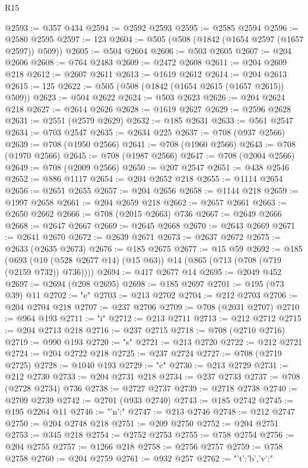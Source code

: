 \begin{lexlean}{R15}
\begin{coremodule}
{{{{{@2593 := @357 @434
@2594 := @2592 @2593
@2595 := @2585 @2594
@2596 := @2580 @2595
@2597 := 123
@2604 := @505 (@508 (@1842 (@1654 @2597 (@1657 @2597)) @509))
@2605 := @504 @2604
@2606 := @503 @2605
@2607 := @204 @2606
@2608 := @764 @2483
@2609 := @2472 @2608
@2611 := @204 @2609 @218
@2612 := @2607 @2611
@2613 := @1619 @2612
@2614 := @204 @2613
@2615 := 125
@2622 := @505 (@508 (@1842 (@1654 @2615 (@1657 @2615)) @509))
@2623 := @504 @2622
@2624 := @503 @2623
@2626 := @204 @2624 @218
@2627 := @2614 @2626
@2628 := @1619 @2627
@2629 := @2596 @2628
@2631 := @2551 (@2579 @2629)
@2632 := @185 @2631
@2633 := @561 @2547
@2634 := @703 @2547
@2635 := @2634 @225
@2637 := @708 (@937 @2566)
@2639 := @708 (@1950 @2566)
@2641 := @708 (@1960 @2566)
@2643 := @708 (@1970 @2566)
@2645 := @708 (@1987 @2566)
@2647 := @708 (@2004 @2566)
@2649 := @708 (@2009 @2566)
@2650 := @207 @2547
@2651 := @438 @2546
@2652 := @886 @1117
@2654 := @204 @2652 @218
@2655 := @1114 @2654
@2656 := @2651 @2655
@2657 := @204 @2656
@2658 := @1144 @218
@2659 := @1997 @2658
@2661 := @204 @2659 @218
@2662 := @2657 @2661
@2663 := @2650 @2662
@2666 := @708 (@2015 @2663) @736
@2667 := @2649 @2666
@2668 := @2647 @2667
@2669 := @2645 @2668
@2670 := @2643 @2669
@2671 := @2641 @2670
@2672 := @2639 @2671
@2673 := @2637 @2672
@2675 := @2633 (@2635 @2673)
@2676 := @185 @2675
@2677 := @15 @59
@2692 := @185
    (@693 (@10 (@528 @2677 @14) (@15 @63)) @14 (@865 (@713 (@708 (@719 (@2159 @732)) @736))))
@2694 := @417 @2677 @14
@2695 := @2049 @452
@2697 := @2694 (@208 @2695)
@2698 := @185 @2697
@2701 := @195 (@73 @39) @11
@2702 := "e"
@2703 := @213 @2702
@2704 := @212 @2703
@2706 := @204 @2704 @218
@2707 := @237 @2706
@2709 := @708 (@2031 @2707)
@2710 := @964 @193
@2711 := "i"
@2712 := @213 @2711
@2713 := @212 @2712
@2715 := @204 @2713 @218
@2716 := @237 @2715
@2718 := @708 (@2710 @2716)
@2719 := @990 @193
@2720 := "s"
@2721 := @213 @2720
@2722 := @212 @2721
@2724 := @204 @2722 @218
@2725 := @237 @2724
@2727 := @708 (@2719 @2725)
@2728 := @1040 @193
@2729 := "c"
@2730 := @213 @2729
@2731 := @212 @2730
@2733 := @204 @2731 @218
@2734 := @237 @2733
@2737 := @708 (@2728 @2734) @736
@2738 := @2727 @2737
@2739 := @2718 @2738
@2740 := @2709 @2739
@2742 := @2701 (@933 @2740)
@2743 := @185 @2742
@2745 := @195 @2264 @11
@2746 := "{'n':"
@2747 := @213 @2746
@2748 := @212 @2747
@2750 := @204 @2748 @218
@2751 := @209 @2750
@2752 := @204 @2751
@2753 := @345 @218
@2754 := @2752 @2753
@2755 := @758 @2754
@2756 := @204 @2755
@2757 := @1266 @218
@2758 := @2756 @2757
@2759 := @758 @2758
@2760 := @204 @2759
@2761 := @932 @257
@2762 := "{'t':'b','v':"
}}}}}}}
\end{coremodule}
\end{lexlean}
